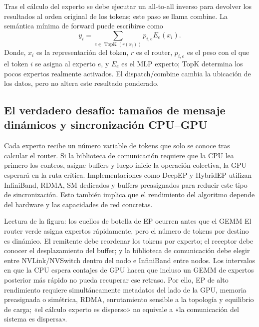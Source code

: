 
Tras el cálculo del experto se debe ejecutar un all-to-all inverso para devolver los resultados al orden original de los tokens; este paso se llama combine. La semántica mínima de forward puede escribirse como
\[
y_i=\sum_{e\in\operatorname{TopK}(r(x_i))}p_{i,e}E_e(x_i).
\]
Donde, $x_i$ es la representación del token, $r$ es el router, $p_{i,e}$ es el peso con el que el token $i$ se asigna al experto $e$, y $E_e$ es el MLP experto; TopK determina los pocos expertos realmente activados. El dispatch/combine cambia la ubicación de los datos, pero no altera este resultado ponderado.


\subsection{El verdadero desafío: tamaños de mensaje dinámicos y sincronización CPU--GPU}

Cada experto recibe un número variable de tokens que solo se conoce tras calcular el router. Si la biblioteca de comunicación requiere que la CPU lea primero los conteos, asigne buffers y luego inicie la operación colectiva, la GPU esperará en la ruta crítica. Implementaciones como DeepEP y HybridEP utilizan InfiniBand, RDMA, SM dedicados y buffers preasignados para reducir este tipo de sincronización. Esto también implica que el rendimiento del algoritmo depende del hardware y las capacidades de red concretas.


\begin{knowledgebox}{Lectura de la figura: los cuellos de botella de EP ocurren antes que el GEMM}
El router verde asigna expertos rápidamente, pero el número de tokens por destino es dinámico. El remitente debe reordenar los tokens por experto; el receptor debe conocer el desplazamiento del buffer; y la biblioteca de comunicación debe elegir entre NVLink/NVSwitch dentro del nodo e InfiniBand entre nodos. Los intervalos en que la CPU espera contajes de GPU hacen que incluso un GEMM de expertos posterior más rápido no pueda recuperar ese retraso. Por ello, EP de alto rendimiento requiere simultáneamente metadatos del lado de la GPU, memoria preasignada o simétrica, RDMA, enrutamiento sensible a la topología y equilibrio de carga; «el cálculo experto es disperso» no equivale a «la comunicación del sistema es dispersa».
\end{knowledgebox}

